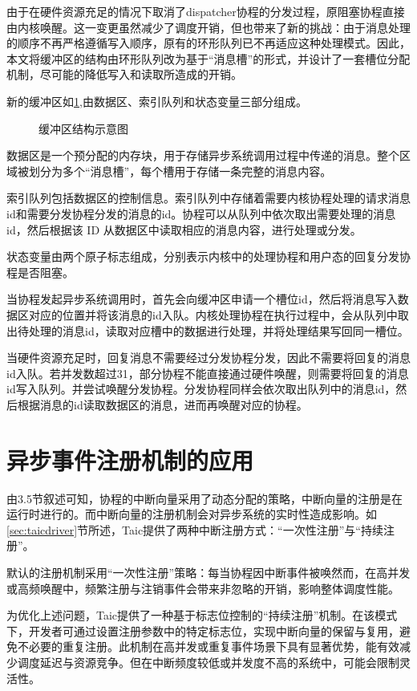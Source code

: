 由于在硬件资源充足的情况下取消了dispatcher协程的分发过程，原阻塞协程直接由内核唤醒。这一变更虽然减少了调度开销，但也带来了新的挑战：由于消息处理的顺序不再严格遵循写入顺序，原有的环形队列已不再适应这种处理模式。因此，本文将缓冲区的结构由环形队列改为基于“消息槽”的形式，并设计了一套槽位分配机制，尽可能的降低写入和读取所造成的开销。

新的缓冲区如\ref{bufferarch},由数据区、索引队列和状态变量三部分组成。

\begin{figure}[htbp]
    \centering
    
    \caption{缓冲区结构示意图}\label{bufferarch}
\end{figure}

数据区是一个预分配的内存块，用于存储异步系统调用过程中传递的消息。整个区域被划分为多个“消息槽”，每个槽用于存储一条完整的消息内容。

索引队列包括数据区的控制信息。索引队列中存储着需要内核协程处理的请求消息id和需要分发协程分发的消息的id。协程可以从队列中依次取出需要处理的消息id，然后根据该 ID 从数据区中读取相应的消息内容，进行处理或分发。

状态变量由两个原子标志组成，分别表示内核中的处理协程和用户态的回复分发协程是否阻塞。

当协程发起异步系统调用时，首先会向缓冲区申请一个槽位id，然后将消息写入数据区对应的位置并将该消息的id入队。内核处理协程在执行过程中，会从队列中取出待处理的消息id，读取对应槽中的数据进行处理，并将处理结果写回同一槽位。

当硬件资源充足时，回复消息不需要经过分发协程分发，因此不需要将回复的消息id入队。若并发数超过31，部分协程不能直接通过硬件唤醒，则需要将回复的消息id写入队列。并尝试唤醒分发协程。分发协程同样会依次取出队列中的消息id，然后根据消息的id读取数据区的消息，进而再唤醒对应的协程。

\section{异步事件注册机制的应用}

由3.5节叙述可知，协程的中断向量采用了动态分配的策略，中断向量的注册是在运行时进行的。而中断向量的注册机制会对异步系统的实时性造成影响。如\ref{sec:taicdriver}节所述，Taic提供了两种中断注册方式：“一次性注册”与“持续注册”。

默认的注册机制采用“一次性注册”策略：每当协程因中断事件被唤然而，在高并发或高频唤醒中，频繁注册与注销事件会带来非忽略的开销，影响整体调度性能。

为优化上述问题，Taic提供了一种基于标志位控制的“持续注册”机制。在该模式下，开发者可通过设置注册参数中的特定标志位，实现中断向量的保留与复用，避免不必要的重复注册。此机制在高并发或重复事件场景下具有显著优势，能有效减少调度延迟与资源竞争。但在中断频度较低或并发度不高的系统中，可能会限制灵活性。

